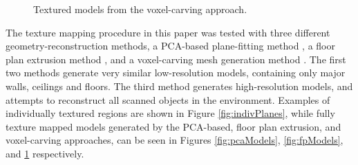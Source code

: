 \documentclass[]{spie}  %
\begin{document}
\begin{figure}
  \caption{Textured models from the voxel-carving approach.}
  \label{fig:voxelModels}
\end{figure}



The texture mapping procedure in this paper was tested with three
different geometry-reconstruction methods, a PCA-based plane-fitting
method \cite{sanchez2012point}, a floor plan extrusion method
\cite{turnerfloorplan}, and a voxel-carving mesh generation method
\cite{turnerwatertight}. The first two methods generate very similar
low-resolution models, containing only major walls, ceilings and
floors. The third method generates high-resolution models, and
attempts to reconstruct all scanned objects in the
environment. Examples of individually textured regions are shown in
Figure \ref{fig:indivPlanes}, while fully texture mapped models
generated by the PCA-based, floor plan extrusion, and voxel-carving
approaches, can be seen in Figures \ref{fig:pcaModels},
\ref{fig:fpModels}, and \ref{fig:voxelModels} respectively.
\end{document}
